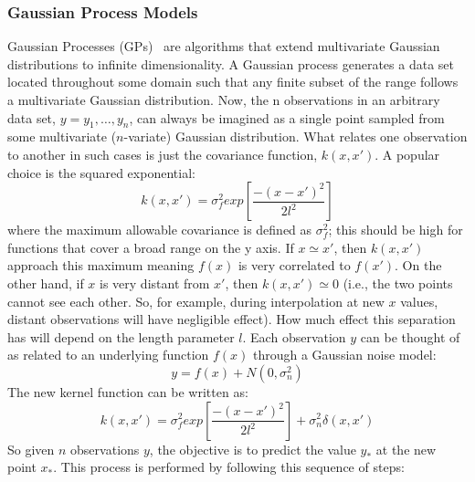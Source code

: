 \subsubsection{Gaussian Process Models}
\label{sec:GPM}
Gaussian Processes (GPs)~\cite{Rasmussen_GPM} are algorithms that extend multivariate Gaussian distributions to infinite dimensionality. A Gaussian process generates a data set located throughout some domain such that any finite subset of the range follows a multivariate Gaussian distribution. Now, the n observations in an arbitrary data set, $y={y_1,\ldots,y_n}$, can always be imagined as a single point sampled from some multivariate ($n$-variate) Gaussian distribution.
What relates one observation to another in such cases is just the covariance function, $k(x,x')$. A popular choice is the squared exponential:
\begin{equation}
k(x,x')=\sigma_{f}^{2}  exp \left [ \frac{-(x-x')^2}{2 l^2} \right ]
\end{equation}
where the maximum allowable covariance is defined as $\sigma_{f}^{2}$; this should be high for functions that cover a broad range on the y axis. If $x \simeq x'$, then $k(x,x')$ approach this maximum meaning $f(x)$ is very correlated to $f(x')$. On the other hand, if $x$ is very distant from $x'$, then $k(x,x' ) \simeq 0$ (i.e., the two points cannot see each other. 
So, for example, during interpolation at new $x$ values, distant observations will have negligible effect). How much effect this separation has will depend on the length parameter $l$.
Each observation $y$ can be thought of as related to an underlying function $f(x)$ through a Gaussian noise model:
\begin{equation}
y=f(x)+N(0,\sigma_{n}^{2})
\end{equation}
The new kernel function can be written as:
\begin{equation}
k(x,x')=\sigma_{f}^{2}  exp \left [ \frac{-(x-x')^2}{2 l^2} \right ] + \sigma_{n}^{2} \delta(x,x')
\end{equation}
So given $n$ observations $y$, the objective is to predict the value $y_*$ at the new point $x_*$. This process is performed by following this sequence of steps:

